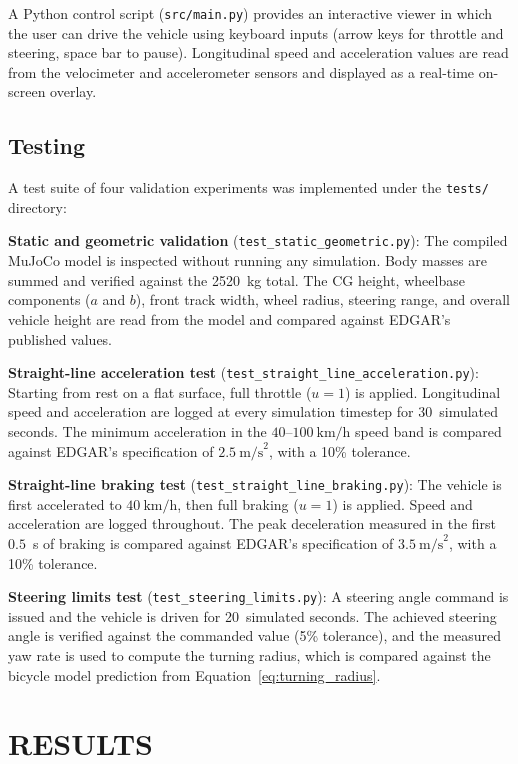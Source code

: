 \documentclass[a4paper,12pt]{report}
\begin{document}
A Python control script (\texttt{src/main.py}) provides an interactive viewer
in which the user can drive the vehicle using keyboard inputs (arrow keys for
throttle and steering, space bar to pause). Longitudinal speed and acceleration
values are read from the velocimeter and accelerometer sensors and displayed as
a real-time on-screen overlay.

\section{Testing}

A test suite of four validation experiments was implemented under the
\texttt{tests/} directory:

\textbf{Static and geometric validation}
(\texttt{test\_static\_geometric.py}): The compiled MuJoCo model is
inspected without running any simulation. Body masses are summed and verified
against the 2520~kg total. The CG height, wheelbase components ($a$ and $b$),
front track width, wheel radius, steering range, and overall vehicle height are
read from the model and compared against EDGAR's published values.

\textbf{Straight-line acceleration test}
(\texttt{test\_straight\_line\_acceleration.py}): Starting from rest on a flat
surface, full throttle ($u = 1$) is applied. Longitudinal speed and
acceleration are logged at every simulation timestep for 30~simulated seconds.
The minimum acceleration in the $40$–$100\ \text{km/h}$ speed band is compared
against EDGAR's specification of $2.5\ \text{m/s}^2$, with a 10\% tolerance.

\textbf{Straight-line braking test}
(\texttt{test\_straight\_line\_braking.py}): The vehicle is first accelerated
to $40\ \text{km/h}$, then full braking ($u = 1$) is applied. Speed and
acceleration are logged throughout. The peak deceleration measured in the first
$0.5$~s of braking is compared against EDGAR's specification of
$3.5\ \text{m/s}^2$, with a 10\% tolerance.

\textbf{Steering limits test}
(\texttt{test\_steering\_limits.py}): A steering angle command is issued and
the vehicle is driven for 20~simulated seconds. The achieved steering angle is
verified against the commanded value (5\% tolerance), and the measured yaw rate
is used to compute the turning radius, which is compared against the bicycle
model prediction from Equation~\ref{eq:turning_radius}.

\chapter{RESULTS}
\end{document}
